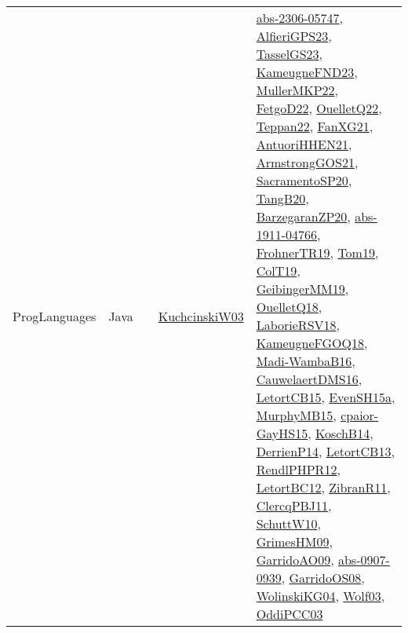 {\begin{longtable}{lp{3cm}>{\raggedright}p{6cm}>{\raggedright}p{6cm}p{8cm}}
ProgLanguages & Java &  & \href{articles/KuchcinskiW03.pdf}{KuchcinskiW03}\cite{KuchcinskiW03} & \href{articles/abs-2306-05747.pdf}{abs-2306-05747}\cite{abs-2306-05747}, \href{articles/AlfieriGPS23.pdf}{AlfieriGPS23}\cite{AlfieriGPS23}, \href{papers/TasselGS23.pdf}{TasselGS23}\cite{TasselGS23}, \href{papers/KameugneFND23.pdf}{KameugneFND23}\cite{KameugneFND23}, \href{articles/MullerMKP22.pdf}{MullerMKP22}\cite{MullerMKP22}, \href{articles/FetgoD22.pdf}{FetgoD22}\cite{FetgoD22}, \href{papers/OuelletQ22.pdf}{OuelletQ22}\cite{OuelletQ22}, \href{papers/Teppan22.pdf}{Teppan22}\cite{Teppan22}, \href{articles/FanXG21.pdf}{FanXG21}\cite{FanXG21}, \href{papers/AntuoriHHEN21.pdf}{AntuoriHHEN21}\cite{AntuoriHHEN21}, \href{papers/ArmstrongGOS21.pdf}{ArmstrongGOS21}\cite{ArmstrongGOS21}, \href{articles/SacramentoSP20.pdf}{SacramentoSP20}\cite{SacramentoSP20}, \href{papers/TangB20.pdf}{TangB20}\cite{TangB20}, \href{papers/BarzegaranZP20.pdf}{BarzegaranZP20}\cite{BarzegaranZP20}, \href{articles/abs-1911-04766.pdf}{abs-1911-04766}\cite{abs-1911-04766}, \href{papers/FrohnerTR19.pdf}{FrohnerTR19}\cite{FrohnerTR19}, \href{papers/Tom19.pdf}{Tom19}\cite{Tom19}, \href{papers/ColT19.pdf}{ColT19}\cite{ColT19}, \href{papers/GeibingerMM19.pdf}{GeibingerMM19}\cite{GeibingerMM19}, \href{papers/OuelletQ18.pdf}{OuelletQ18}\cite{OuelletQ18}, \href{articles/LaborieRSV18.pdf}{LaborieRSV18}\cite{LaborieRSV18}, \href{papers/KameugneFGOQ18.pdf}{KameugneFGOQ18}\cite{KameugneFGOQ18}, \href{papers/Madi-WambaB16.pdf}{Madi-WambaB16}\cite{Madi-WambaB16}, \href{papers/CauwelaertDMS16.pdf}{CauwelaertDMS16}\cite{CauwelaertDMS16}, \href{articles/LetortCB15.pdf}{LetortCB15}\cite{LetortCB15}, \href{articles/EvenSH15a.pdf}{EvenSH15a}\cite{EvenSH15a}, \href{papers/MurphyMB15.pdf}{MurphyMB15}\cite{MurphyMB15}, \href{papers/cpaior-GayHS15.pdf}{cpaior-GayHS15}\cite{cpaior-GayHS15}, \href{papers/KoschB14.pdf}{KoschB14}\cite{KoschB14}, \href{papers/DerrienP14.pdf}{DerrienP14}\cite{DerrienP14}, \href{papers/LetortCB13.pdf}{LetortCB13}\cite{LetortCB13}, \href{papers/RendlPHPR12.pdf}{RendlPHPR12}\cite{RendlPHPR12}, \href{papers/LetortBC12.pdf}{LetortBC12}\cite{LetortBC12}, \href{papers/ZibranR11.pdf}{ZibranR11}\cite{ZibranR11}, \href{papers/ClercqPBJ11.pdf}{ClercqPBJ11}\cite{ClercqPBJ11}, \href{papers/SchuttW10.pdf}{SchuttW10}\cite{SchuttW10}, \href{papers/GrimesHM09.pdf}{GrimesHM09}\cite{GrimesHM09}, \href{articles/GarridoAO09.pdf}{GarridoAO09}\cite{GarridoAO09}, \href{articles/abs-0907-0939.pdf}{abs-0907-0939}\cite{abs-0907-0939}, \href{articles/GarridoOS08.pdf}{GarridoOS08}\cite{GarridoOS08}, \href{papers/WolinskiKG04.pdf}{WolinskiKG04}\cite{WolinskiKG04}, \href{papers/Wolf03.pdf}{Wolf03}\cite{Wolf03}, \href{papers/OddiPCC03.pdf}{OddiPCC03}\cite{OddiPCC03}\\

\end{longtable}}
